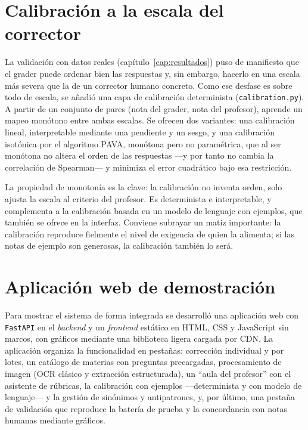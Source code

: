 \section{Calibración a la escala del corrector}
\label{sec:calibracion}

La validación con datos reales (capítulo~\ref{cap:resultados}) puso de manifiesto que el grader puede ordenar bien las respuestas y, sin embargo, hacerlo en una escala más severa que la de un corrector humano concreto. Como ese desfase es sobre todo de escala, se añadió una capa de calibración determinista (\texttt{calibration.py}). A partir de un conjunto de pares (nota del grader, nota del profesor), aprende un mapeo monótono entre ambas escalas. Se ofrecen dos variantes: una calibración lineal, interpretable mediante una pendiente y un sesgo, y una calibración isotónica por el algoritmo PAVA, monótona pero no paramétrica, que al ser monótona no altera el orden de las respuestas —y por tanto no cambia la correlación de Spearman— y minimiza el error cuadrático bajo esa restricción.

La propiedad de monotonía es la clave: la calibración no inventa orden, solo ajusta la escala al criterio del profesor. Es determinista e interpretable, y complementa a la calibración basada en un modelo de lenguaje con ejemplos, que también se ofrece en la interfaz. Conviene subrayar un matiz importante: la calibración reproduce fielmente el nivel de exigencia de quien la alimenta; si las notas de ejemplo son generosas, la calibración también lo será.

\section{Aplicación web de demostración}

Para mostrar el sistema de forma integrada se desarrolló una aplicación web con \texttt{FastAPI} en el \emph{backend} y un \emph{frontend} estático en HTML, CSS y JavaScript sin marcos, con gráficos mediante una biblioteca ligera cargada por CDN. La aplicación organiza la funcionalidad en pestañas: corrección individual y por lotes, un catálogo de materias con preguntas precargadas, procesamiento de imagen (OCR clásico y extracción estructurada), un ``aula del profesor'' con el asistente de rúbricas, la calibración con ejemplos —determinista y con modelo de lenguaje— y la gestión de sinónimos y antipatrones, y, por último, una pestaña de validación que reproduce la batería de prueba y la concordancia con notas humanas mediante gráficos.

